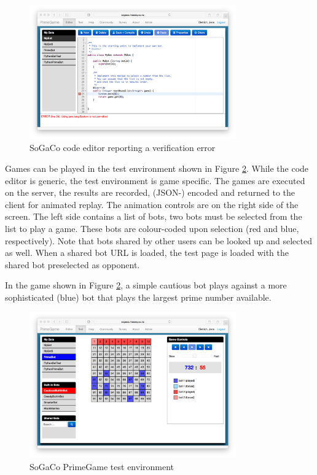 \begin{figure}
	\centering
	\includegraphics[width=8.9cm]{figures/verification.pdf}
	\caption{SoGaCo code editor reporting a verification error}
	\label{fig:verification}
\end{figure}

Games can be played in the test environment shown in Figure \ref{fig:test}. While the code editor is generic, the test environment is game specific. The games are executed on the server, the results are recorded, (JSON-) encoded and returned to the client for animated replay. The animation controls are on the right side of the screen. The left side contains a list of bots, two bots must be selected from the list to play a game. These bots are colour-coded upon selection (red and blue, respectively). Note that bots shared by other users can be looked up and selected as well. When a shared bot URL is loaded, the test page is loaded with the shared bot preselected as opponent.

In the game shown in Figure \ref{fig:test}, a simple cautious bot plays against a more sophisticated (blue) bot that plays the largest prime number available. 

\begin{figure}
	\centering
	\includegraphics[width=8.9cm]{figures/test.pdf}
	\caption{SoGaCo PrimeGame test environment}
	\label{fig:test}
\end{figure}

